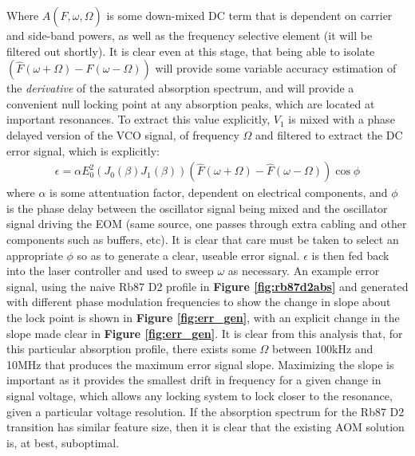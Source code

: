 Where  $A(\hat{F}, \omega, \Omega)$ is some down-mixed DC term that is dependent
on carrier and side-band powers, as well as the frequency selective element
(it will be filtered out shortly). It is clear even at this stage, that being
able to isolate $(\hat{F}(\omega + \Omega) - \hat{F}(\omega - \Omega))$ will
provide some variable accuracy estimation of the \emph{derivative} of the
saturated absorption spectrum, and will provide a convenient null locking point
at any absorption peaks, which are located at important resonances. To extract
this value explicitly, $V_1$ is mixed with a phase delayed version of the
VCO signal, of frequency $\Omega$ and filtered to extract the DC error signal,
which is explicitly:
\begin{gather}\label{eq:err_sig}
  \epsilon = \alpha E_0^2 (J_0(\beta)J_1(\beta))
    (\hat{F}(\omega + \Omega) - \hat{F}(\omega - \Omega))\cos\phi
\end{gather}
where $\alpha$ is some attentuation factor, dependent on electrical components,
and $\phi$ is the phase delay between the oscillator signal being mixed
and the oscillator signal driving the EOM (same source, one passes through
extra cabling and other components such as buffers, etc). It is clear that
care must be taken to select an appropriate $\phi$ so as to generate a
clear, useable error signal. $\epsilon$ is then fed back into the
laser controller and used to sweep $\omega$ as necessary.
An example error signal, using the naive Rb87 D2 profile in
\textbf{Figure \ref{fig:rb87d2abs}} and generated with different phase modulation
frequencies to show the change in slope about the lock point is shown in
\textbf{Figure \ref{fig:err_gen}}, with an explicit
change in the slope made clear in
\textbf{Figure  \ref{fig:err_gen}}. It is clear from
this analysis that, for this particular absorption profile,
there exists some $\Omega$ between 100kHz and 10MHz that produces
the maximum error signal slope. Maximizing the slope is important as it provides
the smallest drift in frequency for a given change in signal voltage, which
allows any locking system to lock closer to the resonance, given a particular
voltage resolution. If the absorption spectrum for the Rb87 D2 transition has
similar feature size, then it is clear that the existing AOM solution is,
at best, suboptimal.

